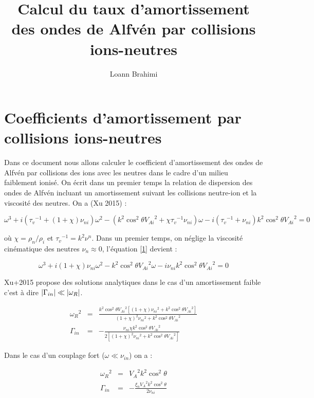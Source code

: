 \documentclass[10pt,a4paper]{article}
\author{Loann Brahimi}
\title{Calcul du taux d'amortissement des ondes de Alfvén par collisions ions-neutres}
\begin{document}
\maketitle 

\section*{Coefficients d'amortissement par collisions ions-neutres}

Dans ce document nous allons calculer le coefficient d'amortissement des ondes de Alfvén par collisions des ions avec les neutres dans le cadre d'un milieu faiblement ionisé. On écrit dans un premier temps la relation de dispersion des ondes de Alfvén incluant un amortissement suivant les collisions neutre-ion et la viscosité des neutres. On a (Xu 2015) :

\begin{equation}
	\omega^3 + i\left({\tau_v}^{-1} + (1+\chi)\nu_{ni}\right)\omega^2 - \left(k^2\cos^2{\theta} {V_{Ai}}^2 + 
	\chi{\tau_v}^{-1}\nu_{ni}\right)\omega - i\left({\tau_v}^{-1} + \nu_{ni}\right)k^2\cos^2{\theta} {V_{Ai}}^2 = 0
	\label{1}
\end{equation}

où $\chi = \rho_n / \rho_i$ et ${\tau_v}^{-1} = k^2 \nu^n$. Dans un premier temps, on néglige la viscosité cinématique des neutres $\nu_n \approx 0$, l'équation \ref{1} devient : 

\begin{equation}
	\omega^3 + i(1+\chi)\nu_{ni}\omega^2 - k^2\cos^2{\theta} {V_{Ai}}^2\omega - i\nu_{ni}k^2\cos^2{\theta} {V_{Ai}}^2 = 0
	\label{2}
\end{equation}

Xu+2015 propose des solutions analytiques dans le cas d'un amortissement faible c'est à dire $\abs{\Gamma_{in}} \ll \abs{\omega_R}$. 

\begin{eqnarray}
	{\omega_R}^2 & = & \frac{k^2\cos^2{\theta}{V_{Ai}}^2 \left[(1+\chi){\nu_{ni}}^2 + k^2 \cos^2{\theta} {V_{Ai}}^2\right]}{(1+\chi)^2{\nu_{ni}}^2 + k^2 \cos^2{\theta} {V_{Ai}}^2} \\
	\Gamma_{in}  & = & - \frac{\nu_{ni}\chi  k^2 \cos^2{\theta} {V_{Ai}}^2}{2\left[ (1+\chi)^2{\nu_{ni}}^2 + k^2 \cos^2{\theta} {V_{Ai}}^2 \right]}
\end{eqnarray}

Dans le cas d'un couplage fort ($\omega \ll \nu_{in}$) on a : 

\begin{eqnarray}
	{\omega_R}^2 & = & {V_{A}}^2 k^2 \cos^2{\theta} \\ 
	\Gamma_{in}  & = & - \frac{\xi_n  {V_{A}}^2 k^2 \cos^2{\theta}}{2 \nu_{ni}}
\end{eqnarray}
\end{document}
